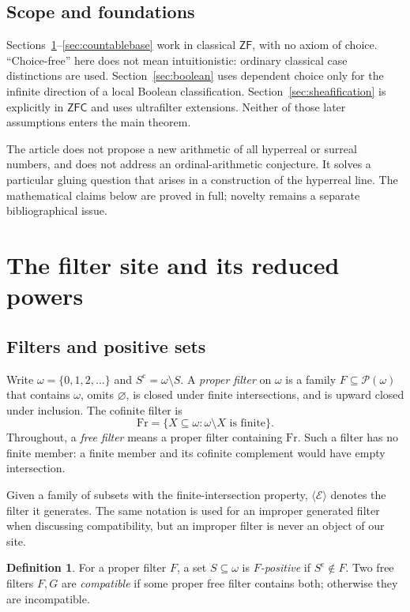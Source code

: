 \documentclass[11pt,letterpaper]{article}
\theoremstyle{definition}
\newtheorem{definition}[theorem]{Definition}
\theoremstyle{remark}
\newcommand{\om}{\omega}
\newcommand{\Fr}{\mathrm{Fr}}
\newcommand{\Pow}{\mathcal P}
\newcommand{\gen}[1]{\langle #1\rangle}
\newcommand{\co}{\mathrm c}
\newcommand{\ZF}{\mathsf{ZF}}
\newcommand{\ZFC}{\mathsf{ZFC}}
\begin{document}
\subsection{Scope and foundations}
Sections~\ref{sec:site}--\ref{sec:countablebase} work in classical $\ZF$,
with no axiom of choice. ``Choice-free'' here does not mean intuitionistic:
ordinary classical case distinctions are used. Section~\ref{sec:boolean}
uses dependent choice only for the infinite direction of a local Boolean
classification. Section~\ref{sec:sheafification} is explicitly in $\ZFC$
and uses ultrafilter extensions. Neither of those later assumptions enters
the main theorem.

The article does not propose a new arithmetic of all hyperreal or surreal
numbers, and does not address an ordinal-arithmetic conjecture. It solves a
particular gluing question that arises in a construction of the hyperreal
line. The mathematical claims below are proved in full; novelty remains a
separate bibliographical issue.

\section{The filter site and its reduced powers}
\label{sec:site}

\subsection{Filters and positive sets}
Write $\om=\{0,1,2,\ldots\}$ and $S^\co=\om\setminus S$.
A \emph{proper filter} on $\om$ is a family $F\subseteq\Pow(\om)$ that
contains $\om$, omits $\varnothing$, is closed under finite intersections,
and is upward closed under inclusion. The cofinite filter is
\[
 \Fr=\{X\subseteq\om:\om\setminus X\text{ is finite}\}.
\]
Throughout, a \emph{free filter} means a proper filter containing $\Fr$.
Such a filter has no finite member: a finite member and its cofinite
complement would have empty intersection.

Given a family of subsets with the finite-intersection property,
$\gen{\mathcal E}$ denotes the filter it generates. The same notation is
used for an improper generated filter when discussing compatibility, but
an improper filter is never an object of our site.

\begin{definition}
For a proper filter $F$, a set $S\subseteq\om$ is \emph{$F$-positive} if
$S^\co\notin F$. Two free filters $F,G$ are \emph{compatible} if some
proper free filter contains both; otherwise they are incompatible.
\end{definition}
\end{document}
